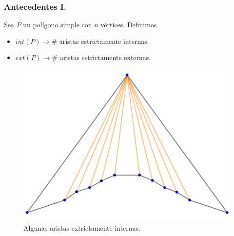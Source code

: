 \begin{frame}
  \frametitle{Antecedentes I.}    
  Sea $P$ un polígono simple con $n$ vértices. Definimos
  \begin{itemize}
  \item $int(P) \rightarrow \#$ aristas estrictamente internas. 
  \item $ext(P) \rightarrow \#$ aristas estrictamente externas.
  \end{itemize}
    \begin{figure}
    \centering
    \includegraphics[width=.35 \paperwidth]{./images/Ejemplo2.png}
    \caption*{Algunas aristas extrictamente internas.}
  \end{figure}
\end{frame}

